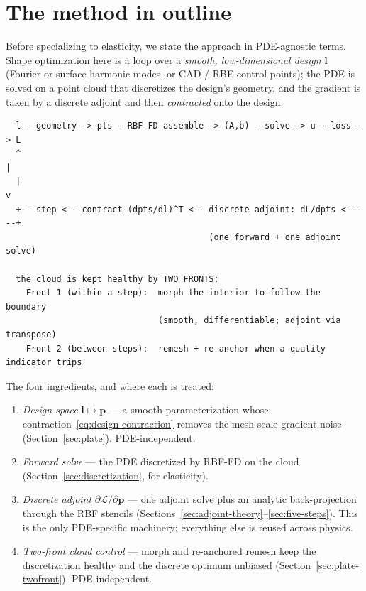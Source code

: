 \documentclass[11pt,a4paper]{article}
\newcommand{\vect}[1]{\boldsymbol{#1}}
\newcommand{\pts}{\vect{p}}
\newcommand{\Loss}{\mathcal{L}}
\begin{document}
\section{The method in outline}
\label{sec:outline}

Before specializing to elasticity, we state the approach in PDE-agnostic terms.
Shape optimization here is a loop over a \emph{smooth, low-dimensional design}
$\vect l$ (Fourier or surface-harmonic modes, or CAD / RBF control points); the PDE
is solved on a point cloud that discretizes the design's geometry, and the gradient
is taken by a discrete adjoint and then \emph{contracted} onto the design.

\begin{footnotesize}
\begin{verbatim}
  l --geometry--> pts --RBF-FD assemble--> (A,b) --solve--> u --loss--> L
  ^                                                                     |
  |                                                                     v
  +-- step <-- contract (dpts/dl)^T <-- discrete adjoint: dL/dpts <-----+
                                        (one forward + one adjoint solve)

  the cloud is kept healthy by TWO FRONTS:
    Front 1 (within a step):  morph the interior to follow the boundary
                              (smooth, differentiable; adjoint via transpose)
    Front 2 (between steps):  remesh + re-anchor when a quality indicator trips
\end{verbatim}
\end{footnotesize}

The four ingredients, and where each is treated:
\begin{enumerate}[label=(\arabic*)]
  \item \emph{Design space} $\vect l \mapsto \pts$ --- a smooth parameterization
        whose contraction~\eqref{eq:design-contraction} removes the mesh-scale
        gradient noise (Section~\ref{sec:plate}). PDE-independent.
  \item \emph{Forward solve} --- the PDE discretized by RBF-FD on the cloud
        (Section~\ref{sec:discretization}, for elasticity).
  \item \emph{Discrete adjoint} $\partial\Loss/\partial\pts$ --- one adjoint solve
        plus an analytic back-projection through the RBF stencils
        (Sections~\ref{sec:adjoint-theory}--\ref{sec:five-steps}). This is the only
        PDE-specific machinery; everything else is reused across physics.
  \item \emph{Two-front cloud control} --- morph and re-anchored remesh keep the
        discretization healthy and the discrete optimum unbiased
        (Section~\ref{sec:plate-twofront}). PDE-independent.
\end{enumerate}
\end{document}

